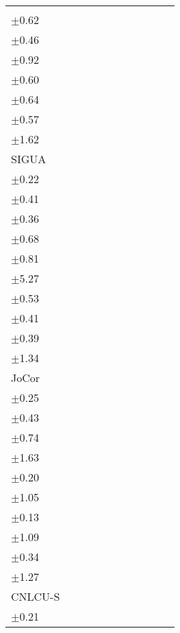 \documentclass[11pt]{article}
\begin{document}
\begin{table}[!htbp]
\begin{tabular}{l |cc|cc|cc|cc|cc}
			& \makecell{73.43\\ $\pm$\scriptsize{0.62}}
			& \makecell{80.94\\ $\pm$\scriptsize{0.46}}
			& \makecell{72.81\\ $\pm$\scriptsize{0.92}}
			& \makecell{81.17\\ $\pm$\scriptsize{0.60}}
			& \textbf{\makecell{74.37\\ $\pm$\scriptsize{0.64}}}
			& \makecell{79.92\\ $\pm$\scriptsize{0.57}}
			&\makecell{73.29\\ $\pm$\scriptsize{1.62}}\\
			\hline	
			SIGUA & \makecell{78.19\\ $\pm$\scriptsize{0.22}} 
			& \makecell{77.67\\ $\pm$\scriptsize{0.41}}
			& \makecell{75.14\\ $\pm$\scriptsize{0.36}}
			& \makecell{52.76\\ $\pm$\scriptsize{0.68}}
			& \makecell{74.41\\ $\pm$\scriptsize{0.81}}
			& \makecell{61.91\\ $\pm$\scriptsize{5.27}}
			& \makecell{75.75\\ $\pm$\scriptsize{0.53}}
			& \makecell{74.05\\ $\pm$\scriptsize{0.41}}
			& \makecell{74.34\\ $\pm$\scriptsize{0.39}}
			& \makecell{67.98\\ $\pm$\scriptsize{1.34}}\\
			\hline	
			JoCor& \makecell{80.96\\ $\pm$\scriptsize{0.25}}
		    & \makecell{76.65\\ $\pm$\scriptsize{0.43}}
		    & \makecell{81.39\\ $\pm$\scriptsize{0.74}}
		    & \makecell{69.92\\ $\pm$\scriptsize{1.63}}
		    & \makecell{80.33\\ $\pm$\scriptsize{0.20}}
		    & \makecell{71.62\\ $\pm$\scriptsize{1.05}}
		    & \makecell{79.03\\ $\pm$\scriptsize{0.13}}
		    & \makecell{74.33\\ $\pm$\scriptsize{1.09}}
		    & \makecell{78.21\\ $\pm$\scriptsize{0.34}}
		    & \makecell{71.46\\ $\pm$\scriptsize{1.27}}\\
			\hline		
			CNLCU-S	& \textbf{\makecell{83.03\\ $\pm$\scriptsize{0.21}}}

\end{tabular}
\end{table}
\end{document}
